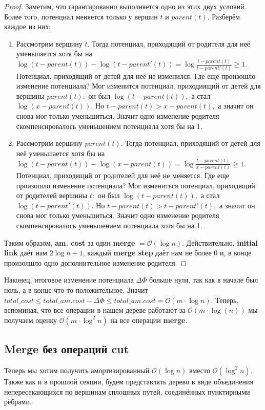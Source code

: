 \begin{proof}
Заметим, что гарантированно выполняется одно из этих двух условий. Более того, потенциал меняется только у вершин $t$ и $parent(t).$ Разберём каждое из них:
\begin{enumerate}
    \item Рассмотрим вершину $t.$ Тогда потенциал, приходящий от родителя для неё уменьшается хотя бы на $\log{(t - parent(t))} - \log{(t - parent'(t))} = \log{\frac{t - parent(t)}{t - parent'(t)}}\geqslant 1.$ Потенциал, приходящий от детей для неё не изменился. Где еще произошло изменение потенциала? Мог изменится потенциал, приходиящий от детей для вершины $parent(t):$ он был $\log{(t - parent(t))},$ а стал $\log{(x - parent(t))}.$ Но $t - parent(t) > x - parent(t),$ а значит он снова мог только уменьшиться. Значит одно изменение родителя скомпенсировалось уменьшением потенциала хотя бы на 1.
    
    \item Рассмотрим вершину $parent(t).$ Тогда потенциал, приходящий от детей для неё уменьшается хотя бы на $\log{(t - parent(t))} - \log{(x - parent(t))} = \log{\frac{t - parent(t)}{x - parent(t)}} \geqslant 1.$ Потенциал, приходящий от родителей для неё не меняется. Где еще произошло изменение потенциала? Мог измениться потенциал, приходящий от родителей вершины $t:$ он был $\log{(t - parent(t))},$ а стал $\log{(t - parent'(t))}.$ Но $t - parent(t) > t - parent'(t),$ а значит он снова мог только уменьшиться. Значит одно изменение родителя скомпенсировалось уменьшением потенциала хотя бы на 1.
\end{enumerate}
Таким образом, \textbf{am. cost} за один \textbf{merge} $=\mathcal{O}(\log{n})$. Действительно, \textbf{initial link} даёт нам $2\log{n} + 1$, каждый \textbf{merge step} даёт нам не более 0 и, в конце произолшло одно дополнительное изменение родителя.
\end{proof}

Наконец, итоговое изменение потенциала $\Delta\Phi$ больше нуля, так как в начале был ноль, а в конце что-то положительное. Значит $total\_cost \leqslant total\_am.cost - \Delta\Phi \leqslant total\_am.cost = \mathcal{O}(m\cdot\log{n}).$ Теперь, вспоминая, что все операции в нашем дереве работают за $\mathcal{O}(m\cdot\log(n))$ мы получаем оценку $\mathcal{O}(m\cdot\log^2{n})$ на все операции \textbf{merge}.

\subsection{Merge без операций cut}
Теперь мы хотим получить амортизированный $\mathcal{O}(\log{n})$ вместо $\mathcal{O}(\log^2{n}).$ Также как и в прошлой секции, будем представлять дерево в виде объединения непересекающихся по вершинам сплошных путей, соединённых пунктирными рёбрами. 

